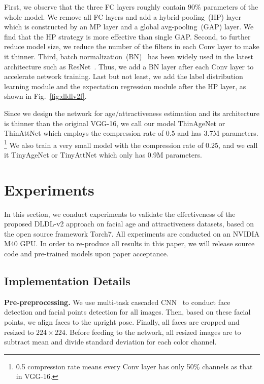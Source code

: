 \documentclass[5p,times,twocolumn]{elsarticle}
\begin{document}
First, we observe that the three FC layers roughly contain $90\%$ parameters of the whole model. We remove all FC layers and add a hybrid-pooling~(HP) layer which is constructed by an MP layer and a global avg-pooling~(GAP) layer. We find that the HP strategy is more effective than single GAP. Second, to further reduce model size, we reduce the number of the filters in each Conv layer to make it thinner. Third, batch normalization~(BN)~\cite{ioffe2015batch} has been widely used in the latest architecture such as ResNet~\cite{he2016deep}. Thus, we add a BN layer after each Conv layer to accelerate network training. Last but not least, we add the label distribution learning module and the expectation regression module after the HP layer, as shown in Fig.~\ref{fig:dldlv2f}.

Since we design the network for age/attractiveness estimation and its architecture is thinner than the original VGG-16, we call our model ThinAgeNet or ThinAttNet which employs the compression rate of 0.5 and has 3.7M parameters. \footnote {0.5 compression rate means every Conv layer has only 50\% channels as that in VGG-16.} 
We also train a very small model with the compression rate of 0.25, and we call it TinyAgeNet or TinyAttNet which only has 0.9M parameters.

\section{Experiments}\label{sec:ex}
In this section, we conduct experiments to validate the effectiveness of the proposed DLDL-v2 approach on facial age and attractiveness datasets, based on the open source framework Torch7. All experiments are conducted on an NVIDIA M40 GPU. In order to re-produce all results in this paper, we will release source code and pre-trained models upon paper acceptance.

\subsection{Implementation Details}

\textbf{Pre-preprocessing.} We use multi-task cascaded CNN~\cite{zhang2016joint} to conduct face detection and facial points detection for all images. Then, based on these facial points, we align faces to the upright pose. Finally, all faces are cropped and resized to $224\times224$. Before feeding to the network, all resized images are to subtract mean and divide standard deviation for each color channel.
\end{document}
